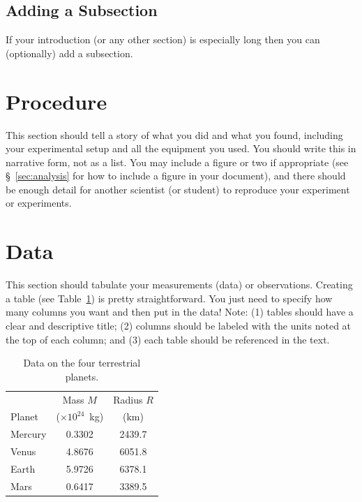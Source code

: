 \documentclass{revtex4}
\begin{document}
\subsection{Adding a Subsection}

If your introduction (or any other section) is especially long then you can (optionally) add a subsection.

\section{Procedure}

This section should tell a story of what you did and what you found, including your experimental setup and all the equipment you used.  You should write this in narrative form, not as a list.  You may include a figure or two if appropriate (see \S~\ref{sec:analysis} for how to include a figure in your document), and there should be enough detail for another scientist (or student) to reproduce your experiment or experiments.

\section{Data}

This section should tabulate your measurements (data) or observations. Creating a table (see Table~\ref{tab:data}) is pretty straightforward.  You just need to specify how many columns you want and then put in the data! Note: (1) tables should have a clear and descriptive title; (2) columns should be labeled with the units noted at the top of each column; and (3) each table should be referenced in the text.

\begin{table}[h]
\centering
\begin{tabular}{lcc}
\hline
  & Mass $M$ & Radius $R$ \\
Planet & ($\times10^{24}$~kg) & (km) \\
\hline
\hline
Mercury & 0.3302 & 2439.7 \\
Venus   & 4.8676 & 6051.8 \\
Earth   & 5.9726 & 6378.1 \\
Mars    & 0.6417 & 3389.5 \\
\hline
\end{tabular}
\caption{Data on the four terrestrial planets. \label{tab:data}} 
\end{table}
\end{document}
